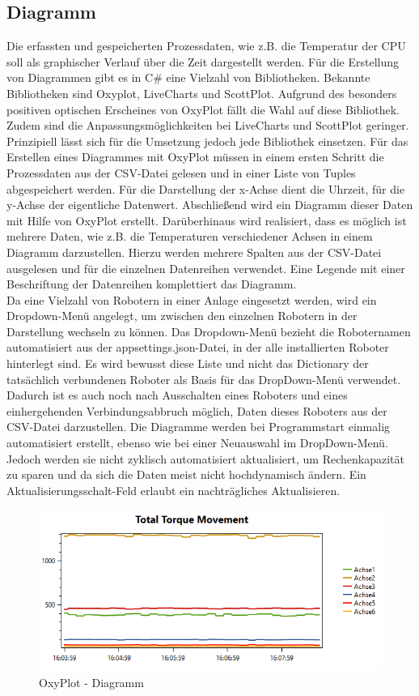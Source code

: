 \documentclass[ a4paper,
                oneside,
                toc=bibliography,
                toc=listof
                ]{scrbook}
\begin{document}
   	\subsection{Diagramm}
   	Die erfassten und gespeicherten Prozessdaten, wie z.B. die Temperatur der CPU soll als graphischer Verlauf über die Zeit dargestellt werden. Für die Erstellung von Diagrammen gibt es in C\# eine Vielzahl von Bibliotheken. Bekannte Bibliotheken sind Oxyplot, LiveCharts und ScottPlot. Aufgrund des besonders positiven optischen Erscheines von OxyPlot fällt die Wahl auf diese Bibliothek. Zudem sind die Anpassungsmöglichkeiten bei LiveCharts und ScottPlot geringer. Prinzipiell lässt sich für die Umsetzung jedoch jede Bibliothek einsetzen. Für das Erstellen eines Diagrammes mit OxyPlot müssen in einem ersten Schritt die Prozessdaten aus der CSV-Datei gelesen und in einer Liste von Tuples abgespeichert werden. Für die Darstellung der x-Achse dient die Uhrzeit, für die y-Achse der eigentliche Datenwert. Abschließend wird ein Diagramm dieser Daten mit Hilfe von OxyPlot erstellt. Darüberhinaus wird realisiert, dass es möglich ist mehrere Daten, wie z.B. die Temperaturen verschiedener Achsen in einem Diagramm darzustellen. Hierzu werden mehrere Spalten aus der CSV-Datei ausgelesen und für die einzelnen Datenreihen verwendet. Eine Legende mit einer Beschriftung der Datenreihen komplettiert das Diagramm. \\
   	Da eine Vielzahl von Robotern in einer Anlage eingesetzt werden, wird ein Dropdown-Menü angelegt, um zwischen den einzelnen Robotern in der Darstellung wechseln zu können. Das Dropdown-Menü bezieht die Roboternamen automatisiert aus der appsettings.json-Datei, in der alle installierten Roboter hinterlegt sind. Es wird bewusst diese Liste und nicht das Dictionary der tatsächlich verbundenen Roboter als Basis für das DropDown-Menü verwendet. Dadurch ist es auch noch nach Ausschalten eines Roboters und eines einhergehenden Verbindungsabbruch möglich, Daten dieses Roboters aus der CSV-Datei darzustellen. Die Diagramme werden bei Programmstart einmalig automatisiert erstellt, ebenso wie bei einer Neuauswahl im DropDown-Menü. Jedoch werden sie nicht zyklisch automatisiert aktualisiert, um Rechenkapazität zu sparen und da sich die Daten meist nicht hochdynamisch ändern. Ein Aktualisierungsschalt-Feld erlaubt ein nachträgliches Aktualisieren.
   	\begin{figure}[!ht]
   		\centering
   		\includegraphics[width=1.0\linewidth]{./images/Diagrammoxyplot.png}
   		\caption{OxyPlot - Diagramm}
   		\label{fig:oxyplot}
   	\end{figure}
   	
\end{document}
